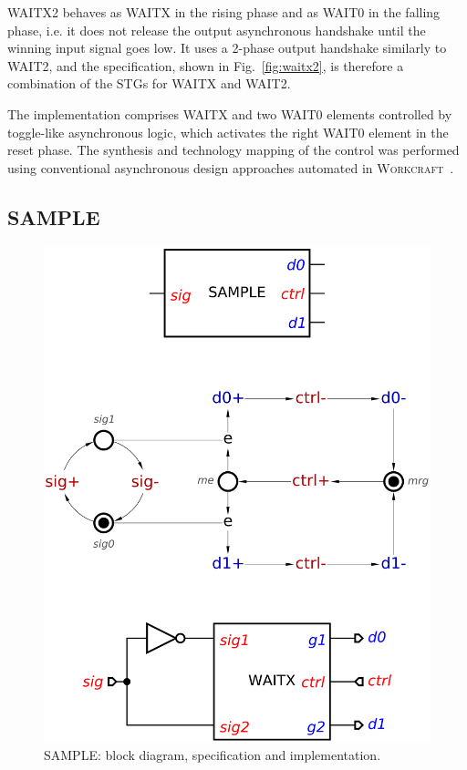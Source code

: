 \documentclass[conference]{IEEEtran}
\begin{document}
\textsf{WAITX2} behaves as \textsf{WAITX} in the rising phase and as \textsf{WAIT0}
in the falling phase, i.e. it does not release the output asynchronous handshake until
the winning input signal goes low. It uses a 2-phase output handshake similarly to
\textsf{WAIT2}, and the specification, shown in Fig.~\ref{fig:waitx2}, is therefore
a combination of the STGs for \textsf{WAITX} and \textsf{WAIT2}.

The implementation comprises \textsf{WAITX} and two \textsf{WAIT0} elements controlled
by toggle-like asynchronous logic, which activates the right \textsf{WAIT0} element in the
reset phase. The synthesis and technology mapping of the control was performed using
conventional asynchronous design approaches automated in
\textsc{Workcraft}~\cite{2017_sokolov_a4a}.

\subsection*{\textsf{SAMPLE}}

\begin{figure}
\begin{center}
    \includegraphics[scale=0.23]{fig/SAMPLE.pdf}
    \caption{\textsf{SAMPLE}: block diagram, specification and implementation.}
    \label{fig:sample}
    \vspace{-6mm}
\end{center}
\end{figure}
\end{document}
